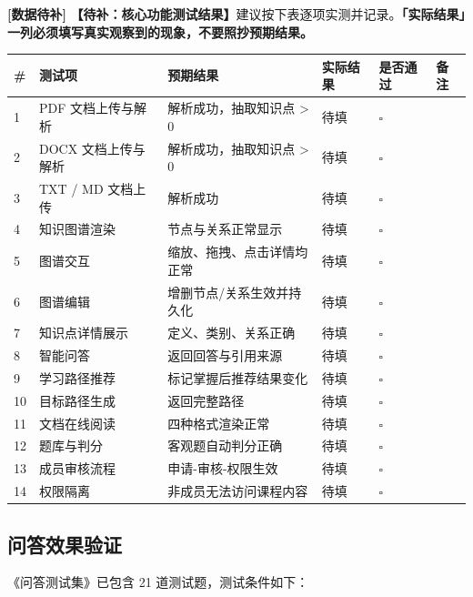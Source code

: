 \documentclass[UTF8,a4paper,11pt]{ctexrep}
\newcommand{\todomark}{\textcolor{todobar}{\textbf{[数据待补]}}}
\begin{document}
\begin{todobox}
\todomark{} \textbf{【待补：核心功能测试结果】}建议按下表逐项实测并记录。\textbf{「实际结果」一列必须填写真实观察到的现象，不要照抄预期结果。}

\begin{center}
\footnotesize
\begin{tabularx}{\linewidth}{@{}XXXXXX@{}}
\toprule
\# & 测试项 & 预期结果 & 实际结果 & 是否通过 & 备注 \\
\midrule
1 & PDF 文档上传与解析 & 解析成功，抽取知识点 > 0 & 待填 & $\square$ &  \\
2 & DOCX 文档上传与解析 & 解析成功，抽取知识点 > 0 & 待填 & $\square$ &  \\
3 & TXT / MD 文档上传 & 解析成功 & 待填 & $\square$ &  \\
4 & 知识图谱渲染 & 节点与关系正常显示 & 待填 & $\square$ &  \\
5 & 图谱交互 & 缩放、拖拽、点击详情均正常 & 待填 & $\square$ &  \\
6 & 图谱编辑 & 增删节点/关系生效并持久化 & 待填 & $\square$ &  \\
7 & 知识点详情展示 & 定义、类别、关系正确 & 待填 & $\square$ &  \\
8 & 智能问答 & 返回回答与引用来源 & 待填 & $\square$ &  \\
9 & 学习路径推荐 & 标记掌握后推荐结果变化 & 待填 & $\square$ &  \\
10 & 目标路径生成 & 返回完整路径 & 待填 & $\square$ &  \\
11 & 文档在线阅读 & 四种格式渲染正常 & 待填 & $\square$ &  \\
12 & 题库与判分 & 客观题自动判分正确 & 待填 & $\square$ &  \\
13 & 成员审核流程 & 申请-审核-权限生效 & 待填 & $\square$ &  \\
14 & 权限隔离 & 非成员无法访问课程内容 & 待填 & $\square$ &  \\
\bottomrule
\end{tabularx}
\end{center}
\end{todobox}


\subsection{问答效果验证}

《问答测试集》已包含 21 道测试题，测试条件如下：
\end{document}
